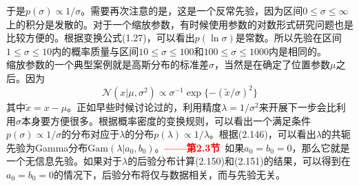\documentclass[b5paper]{book}
\numberwithin{equation}{chapter}
\newcommand {\calN} {\mathcal{N}}
\begin{document}
{	于是$p(\sigma) \propto 1/\sigma$。需要再次注意的是，这是一个反常先验，因为区间$0 \leqslant \sigma \leqslant \infty$上的积分是发散的。对于一个缩放参数，有时候使用参数的对数形式研究问题也是比较方便的。根据变换公式(1.27)，可以看出$p(\ln \sigma)$是常数。所以先验在区间$1 \leqslant \sigma \leqslant 10$内的概率质量与区间$10 \leqslant \sigma \leqslant 100$和$100 \leqslant \sigma \leqslant 1000$内是相同的。\\
	\indent 缩放参数的一个典型案例就是高斯分布的标准差$\sigma$，当然是在确定了位置参数$\mu$之后。因为
	\begin{equation}
		\calN(x|\mu,\sigma^2) \propto \sigma^{-1} \exp\{-(\widetilde{x}/\sigma)^2\}
	\end{equation}
	其中$\widetilde{x}=x-\mu$。正如早些时候讨论过的，利用精度$\lambda = 1/\sigma^2$来开展下一步会比利用$\sigma$本身要方便很多。根据概率密度的变换规则，可以看出一个满足条件$p(\sigma) \propto 1/\sigma$的分布对应于$\lambda$的分布$p(\lambda)\propto 1/\lambda$。根据(2.146)，可以看出$\lambda$的共轭先验为Gamma分布$\mathrm{Gam}(\lambda|a_0,b_0)$。\textcolor{red}{\textbf{——第2.3节}}\ 如果$a_0=b_0=0$，那么它就是一个无信息先验。如果对于$\lambda$的后验分布计算(2.150)和(2.151)的结果，可以得到在$a_0=b_0=0$的情况下，后验分布将仅与数据相关，而与先验无关。
	}
\end{document}
